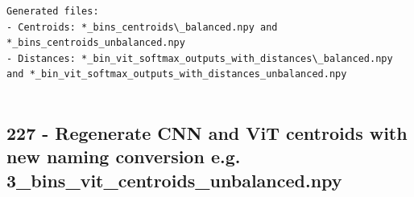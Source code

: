 \begin{verbatim}
Generated files:
- Centroids: *_bins_centroids\_balanced.npy and *_bins_centroids_unbalanced.npy
- Distances: *_bin_vit_softmax_outputs_with_distances\_balanced.npy and *_bin_vit_softmax_outputs_with_distances_unbalanced.npy


\end{verbatim}

\subsection{227 - Regenerate CNN and ViT centroids with new naming conversion e.g. 3\_bins\_vit\_centroids\_unbalanced.npy}
\label{app_res:227}

